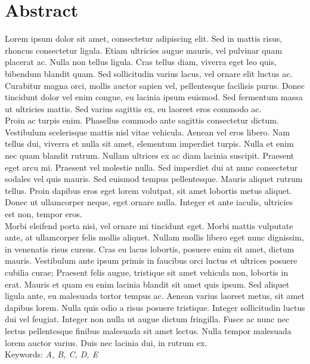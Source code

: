 \documentclass[12pt]{report}
\begin{document}
\chapter*{Abstract}
\bigskip
Lorem ipsum dolor sit amet, consectetur adipiscing elit. Sed in mattis risus, rhoncus consectetur ligula. Etiam ultricies augue mauris, vel pulvinar quam placerat ac. Nulla non tellus ligula. Cras tellus diam, viverra eget leo quis, bibendum blandit quam. Sed sollicitudin varius lacus, vel ornare elit luctus ac. Curabitur magna orci, mollis auctor sapien vel, pellentesque facilisis purus. Donec tincidunt dolor vel enim congue, eu lacinia ipsum euismod. Sed fermentum massa ut ultricies mattis. Sed varius sagittis ex, eu laoreet eros commodo ac.\\

\noindent Proin ac turpis enim. Phasellus commodo ante sagittis consectetur dictum. Vestibulum scelerisque mattis nisl vitae vehicula. Aenean vel eros libero. Nam tellus dui, viverra et nulla sit amet, elementum imperdiet turpis. Nulla et enim nec quam blandit rutrum. Nullam ultrices ex ac diam lacinia suscipit. Praesent eget arcu mi. Praesent vel molestie nulla. Sed imperdiet dui at nunc consectetur sodales vel quis mauris. Sed euismod tempus pellentesque. Mauris aliquet rutrum tellus. Proin dapibus eros eget lorem volutpat, sit amet lobortis metus aliquet. Donec ut ullamcorper neque, eget ornare nulla. Integer et ante iaculis, ultricies est non, tempor eros.\\

\noindent Morbi eleifend porta nisi, vel ornare mi tincidunt eget. Morbi mattis vulputate ante, at ullamcorper felis mollis aliquet. Nullam mollis libero eget nunc dignissim, in venenatis risus cursus. Cras eu lacus lobortis, posuere enim sit amet, dictum mauris. Vestibulum ante ipsum primis in faucibus orci luctus et ultrices posuere cubilia curae; Praesent felis augue, tristique sit amet vehicula non, lobortis in erat. Mauris et quam eu enim lacinia blandit sit amet quis ipsum. Sed aliquet ligula ante, eu malesuada tortor tempus ac. Aenean varius laoreet metus, sit amet dapibus lorem. Nulla quis odio a risus posuere tristique. Integer sollicitudin luctus dui vel feugiat. Integer non nulla ut augue dictum fringilla. Fusce ac nunc nec lectus pellentesque finibus malesuada sit amet lectus. Nulla tempor malesuada lorem auctor varius. Duis nec lacinia dui, in rutrum ex.\\
\newline
Keywords: \textit{A, B, C, D, E}
\tableofcontents
{}
\end{document}
